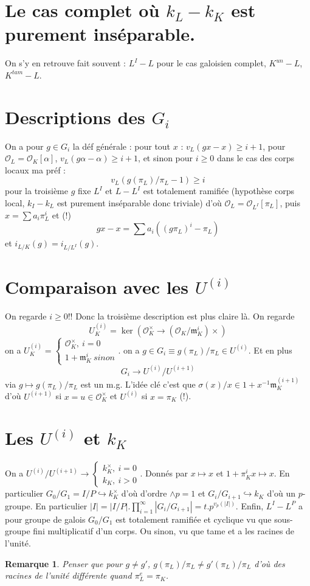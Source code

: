 \documentclass[a4paper,12pt]{book}
\newcommand{\Or}{\mathcal{O}}
\newcommand{\m}{\mathfrak m}
\theoremstyle{plain}
\newtheorem{rem}{Remarque}
\theoremstyle{definition}
\theoremstyle{remark}
\begin{document}
\section{Le cas complet où $k_L-k_K$ est purement inséparable.}
On s'y en retrouve fait souvent : $L^I-L$ pour le cas galoisien
complet, $K^{un}-L$, $K^{tam}-L$. 
\section{Descriptions des $G_i$}
On a pour $g\in G_i$ la déf générale : pour tout $x$ : 
$v_L(gx-x)\geq i+1$, pour $\Or_L=\Or_K[\alpha]$, 
$v_L(g\alpha-\alpha)\geq i+1 $, et sinon pour $i\geq 0$ dans
le cas des corps locaux ma préf :
\[v_L(g(\pi_L)/\pi_L-1)\geq i\]
pour la troisième $g$ fixe $L^I$ et $L-L^I$ est totalement ramifiée
(hypothèse corps local, $k_I-k_L$ est purement inséparable donc
triviale) d'où $\Or_L=\Or_{L^I}[\pi_L]$, puis $x=\sum a_i\pi_L^i$
et (!)
\[gx-x=\sum a_i((g\pi_L)^i -\pi_L)\]
et $i_{L/K}(g)=i_{L/L^I}(g)$.

\section{Comparaison avec les $U^{(i)}$}
On regarde $i\geq 0$!!
Donc la troisième description est plus claire là. On regarde 
\[U_K^{(i)}=\ker(\Or_K^\times\to (\Or_K/\m_K^i)\times)\]
on a 
$U_K^{(i)}=\begin{cases} \Or_K^\times,~i=0\\ 1+\m_K^i~sinon\end{cases}$.
on a $g\in G_i\equiv g(\pi_L)/\pi_L\in U^{(i)}$. Et en plus
\[G_i\to U^{(i)}/U^{(i+1)}\]
via $g\mapsto g(\pi_L)/\pi_L$ est un m.g. L'idée clé c'est que
$\sigma(x)/x\in 1+x^{-1}\m_K^{(i+1)}$ d'où $U^{(i+1)}$ si
$x=u\in \Or_K^\times$ et $U^{(i)}$ si $x=\pi_K$ (!).


\section{Les $U^{(i)}$ et $k_K$}
On a $U^{(i)}/U^{(i+1)}\to
\begin{cases}k_K^\times,~i=0\\ k_K,~i>0\end{cases}$. Donnés par
$x\mapsto x$ et $1+\pi_K^ix\mapsto x$. En particulier
$G_0/G_1=I/P\hookrightarrow k_K^\times$ d'où d'ordre $\wedge p=1$
et $G_i/G_{i+1}\hookrightarrow k_K$ d'où un $p$-groupe. En 
particulier 
$|I|=|I/P|.\prod_{i=1}^\infty |G_i/G_{i+1}|=t.p^{v_p(|I|)}$.
Enfin, $L^I-L^P$ a pour groupe de galois $G_0/G_1$ est totalement
ramifiée et cyclique vu que sous-groupe fini multiplicatif d'un
corps. Ou sinon, vu que tame et a les racines de l'unité. 
\begin{rem}
    Penser que pour $g\ne g'$, $g(\pi_L)/\pi_L\ne g'(\pi_L)/\pi_L$
    d'où des racines de l'unité différente quand
    $\pi_L^e=\pi_K$.
\end{rem}
\end{document}
